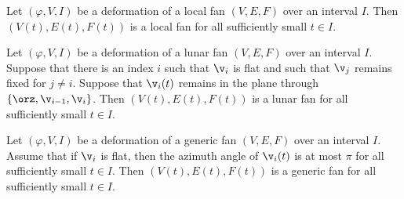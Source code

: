 



\begin{lemma}\label{lemma:fan-open}
  Let $(\varphi,V,I)$ be a deformation of a  local fan
  $(V,E,F)$ over an interval $I$. 
Then $(V(t),E(t),F(t))$ is a
local fan for all sufficiently small $t\in I$.
\end{lemma}

\begin{lemma}\label{lemma:fan-open-lunar}
  Let $(\varphi,V,I)$ be a deformation of a lunar fan $(V,E,F)$ over
  an interval $I$.  Suppose that there is an index $i$ such that
  $\v_i$ is flat and such that $\v_j$ remains fixed for $j\ne i$.
  Suppose that $\v_i(t)$ remains in the plane through
  $\{\orz,\v_{i-1},\v_i\}$.  Then $(V(t),E(t),F(t))$
 is a lunar fan for
  all sufficiently small $t\in I$.
\end{lemma}

\begin{lemma}\label{lemma:fan-open-generic}
Let $(\varphi,V,I)$ be a deformation of a generic fan
  $(V,E,F)$ over an interval $I$.  
Assume that if $\v_i$ is flat, then the azimuth angle of $\v_i(t)$ is at most
$\pi$ for all sufficiently small $t\in I$.  Then 
 $(V(t),E(t),F(t))$ is a
generic fan for all sufficiently small $t\in I$.
\end{lemma}


